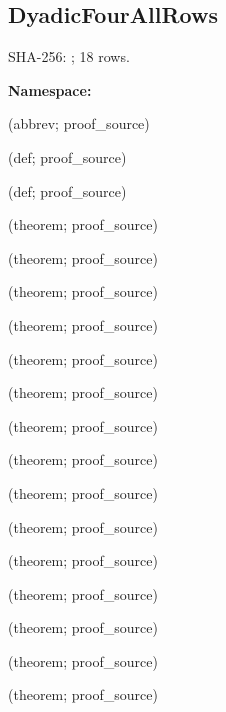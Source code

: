 \subsection*{DyadicFourAllRows}
{\footnotesize SHA-256: ; 18 rows.}\par
\begingroup\small
\textbf{Namespace:} \par
\noindent{} {\scriptsize (abbrev; proof\_source)}\par
\noindent{} {\scriptsize (def; proof\_source)}\par
\noindent{} {\scriptsize (def; proof\_source)}\par
\noindent{} {\scriptsize (theorem; proof\_source)}\par
\noindent{} {\scriptsize (theorem; proof\_source)}\par
\noindent{} {\scriptsize (theorem; proof\_source)}\par
\noindent{} {\scriptsize (theorem; proof\_source)}\par
\noindent{} {\scriptsize (theorem; proof\_source)}\par
\noindent{} {\scriptsize (theorem; proof\_source)}\par
\noindent{} {\scriptsize (theorem; proof\_source)}\par
\noindent{} {\scriptsize (theorem; proof\_source)}\par
\noindent{} {\scriptsize (theorem; proof\_source)}\par
\noindent{} {\scriptsize (theorem; proof\_source)}\par
\noindent{} {\scriptsize (theorem; proof\_source)}\par
\noindent{} {\scriptsize (theorem; proof\_source)}\par
\noindent{} {\scriptsize (theorem; proof\_source)}\par
\noindent{} {\scriptsize (theorem; proof\_source)}\par
\noindent{} {\scriptsize (theorem; proof\_source)}\par
\endgroup
